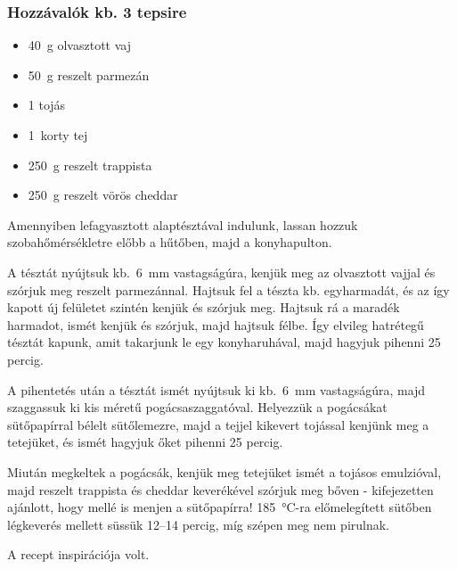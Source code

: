\subsubsection*{Hozzávalók kb. 3 tepsire}
\begin{itemize}
    \item \qty{40}{\g} olvasztott vaj
    \item \qty{50}{\g} reszelt parmezán
    \item \num{1} tojás
    \item \qty{1}{korty} tej
    \item \qty{250}{\g} reszelt trappista
    \item \qty{250}{\g} reszelt vörös cheddar
\end{itemize}

Amennyiben lefagyasztott alaptésztával indulunk, lassan hozzuk szobahőmérsékletre előbb a hűtőben, majd a konyhapulton.

A tésztát nyújtsuk kb.~\qty{6}{\mm} vastagságúra, kenjük meg az olvasztott vajjal és szórjuk meg reszelt parmezánnal. Hajtsuk fel a tészta kb. egyharmadát, és az így kapott új felületet szintén kenjük és szórjuk meg. Hajtsuk rá a maradék harmadot, ismét kenjük és szórjuk, majd hajtsuk félbe. Így elvileg hatrétegű tésztát kapunk, amit takarjunk le egy konyharuhával, majd hagyjuk pihenni \num{25} percig.

A pihentetés után a tésztát ismét nyújtsuk ki kb.~\qty{6}{\mm} vastagságúra, majd szaggassuk ki kis méretű pogácsaszaggatóval. Helyezzük a pogácsákat sütőpapírral bélelt sütőlemezre, majd a tejjel kikevert tojással kenjünk meg a tetejüket, és ismét hagyjuk őket pihenni \num{25} percig.

Miután megkeltek a pogácsák, kenjük meg tetejüket ismét a tojásos emulzióval, majd reszelt trappista és cheddar keverékével szórjuk meg bőven - kifejezetten ajánlott, hogy mellé is menjen a sütőpapírra! \qty{185}{\celsius}-ra előmelegített sütőben légkeverés mellett süssük \numrange{12}{14} percig, míg szépen meg nem pirulnak.

A recept inspirációja \cite{szabi_pogi} volt.
 